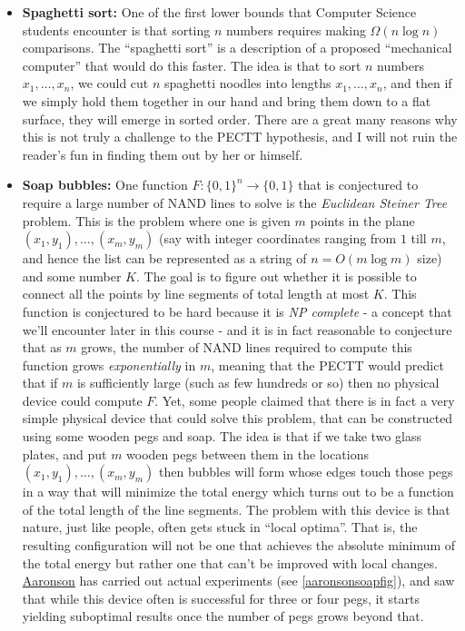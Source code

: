 \begin{itemize}
\item
  \textbf{Spaghetti sort:} One of the first lower bounds that Computer
  Science students encounter is that sorting \(n\) numbers requires
  making \(\Omega(n \log n)\) comparisons. The ``spaghetti sort'' is a
  description of a proposed ``mechanical computer'' that would do this
  faster. The idea is that to sort \(n\) numbers \(x_1,\ldots,x_n\), we
  could cut \(n\) spaghetti noodles into lengths \(x_1,\ldots,x_n\), and
  then if we simply hold them together in our hand and bring them down
  to a flat surface, they will emerge in sorted order. There are a great
  many reasons why this is not truly a challenge to the PECTT
  hypothesis, and I will not ruin the reader's fun in finding them out
  by her or himself.
\item
  \textbf{Soap bubbles:} One function
  \(F:\{0,1\}^n \rightarrow \{0,1\}\) that is conjectured to require a
  large number of NAND lines to solve is the \emph{Euclidean Steiner
  Tree} problem. This is the problem where one is given \(m\) points in
  the plane \((x_1,y_1),\ldots,(x_m,y_m)\) (say with integer coordinates
  ranging from \(1\) till \(m\), and hence the list can be represented
  as a string of \(n=O(m \log m)\) size) and some number \(K\). The goal
  is to figure out whether it is possible to connect all the points by
  line segments of total length at most \(K\). This function is
  conjectured to be hard because it is \emph{NP complete} - a concept
  that we'll encounter later in this course - and it is in fact
  reasonable to conjecture that as \(m\) grows, the number of NAND lines
  required to compute this function grows \emph{exponentially} in \(m\),
  meaning that the PECTT would predict that if \(m\) is sufficiently
  large (such as few hundreds or so) then no physical device could
  compute \(F\). Yet, some people claimed that there is in fact a very
  simple physical device that could solve this problem, that can be
  constructed using some wooden pegs and soap. The idea is that if we
  take two glass plates, and put \(m\) wooden pegs between them in the
  locations \((x_1,y_1),\ldots,(x_m,y_m)\) then bubbles will form whose
  edges touch those pegs in a way that will minimize the total energy
  which turns out to be a function of the total length of the line
  segments. The problem with this device is that nature, just like
  people, often gets stuck in ``local optima''. That is, the resulting
  configuration will not be one that achieves the absolute minimum of
  the total energy but rather one that can't be improved with local
  changes.
  \href{http://www.scottaaronson.com/papers/npcomplete.pdf}{Aaronson}
  has carried out actual experiments (see \cref{aaronsonsoapfig}), and
  saw that while this device often is successful for three or four pegs,
  it starts yielding suboptimal results once the number of pegs grows
  beyond that.
\end{itemize}


